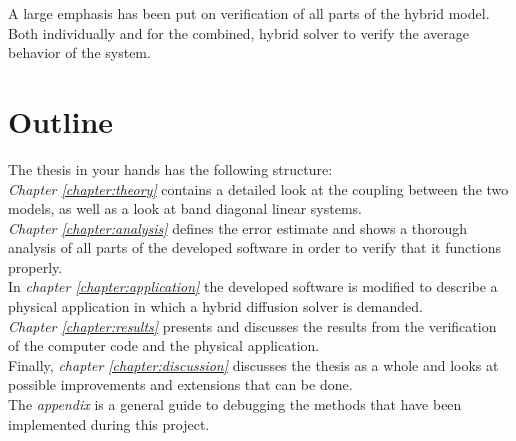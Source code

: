 \noindent A large emphasis has been put on verification of all parts of the hybrid model. 
Both individually and for the combined, hybrid solver to verify the average behavior of the system.\\

\section{Outline}
\noindent The thesis in your hands has the following structure: \\

\noindent \emph{Chapter \ref{chapter:theory}} contains a detailed look at the coupling between the two models, as well as a look at band diagonal linear systems. \\

\noindent \emph{Chapter \ref{chapter:analysis}} defines the error estimate and shows a thorough analysis of all parts of the developed software in order to verify that it functions properly. \\

\noindent In \emph{chapter \ref{chapter:application}} the developed software is modified to describe a physical application in which a hybrid diffusion solver is demanded. \\

\noindent \emph{Chapter \ref{chapter:results}} presents and discusses the results from the verification of the computer code and the physical application. \\

\noindent Finally, \emph{chapter \ref{chapter:discussion}} discusses the thesis as a whole and looks at possible improvements and extensions that can be done. \\

\noindent The \emph{appendix} is a general guide to debugging the methods that have been implemented during this project.